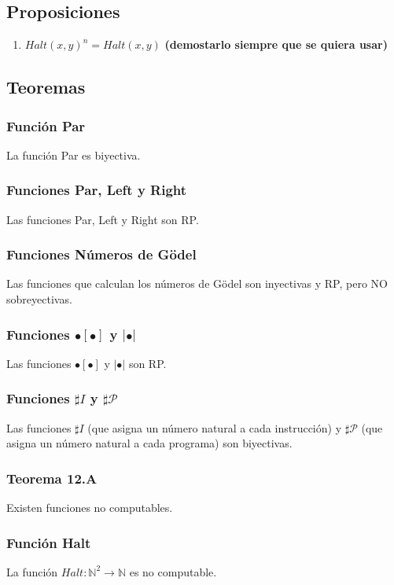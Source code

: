 \documentclass{article}
\newcommand{\naturales}{\mathbb{N}}                     %
\newcommand{\partes}{\mathcal{P}}
\begin{document}
\subsection{Proposiciones}
\begin{enumerate}
    \item $Halt(x,y)^n = Halt(x,y)$ \textbf{(demostarlo siempre que se quiera usar)}
\end{enumerate}

\subsection{Teoremas}
\subsubsection{Función Par}
La función Par es biyectiva.

\subsubsection{Funciones Par, Left y Right}
Las funciones Par, Left y Right son RP.

\subsubsection{Funciones Números de Gödel}
Las funciones que calculan los números de Gödel son inyectivas y RP, pero NO sobreyectivas.

\subsubsection{Funciones $\bullet[\bullet]$ y $| \bullet |$}
Las funciones $\bullet[\bullet]$ y $| \bullet |$ son RP.

\subsubsection{Funciones $\sharp I$ y $\sharp \partes$}
Las funciones $\sharp I$ (que asigna un número natural a cada instrucción) y $\sharp \partes$ (que asigna un número natural a cada programa) son biyectivas.

\subsubsection{Teorema 12.A}
Existen funciones no computables.

\subsubsection{Función Halt}
La función $Halt: \naturales^2 \rightarrow \naturales$ es no computable.
\end{document}
